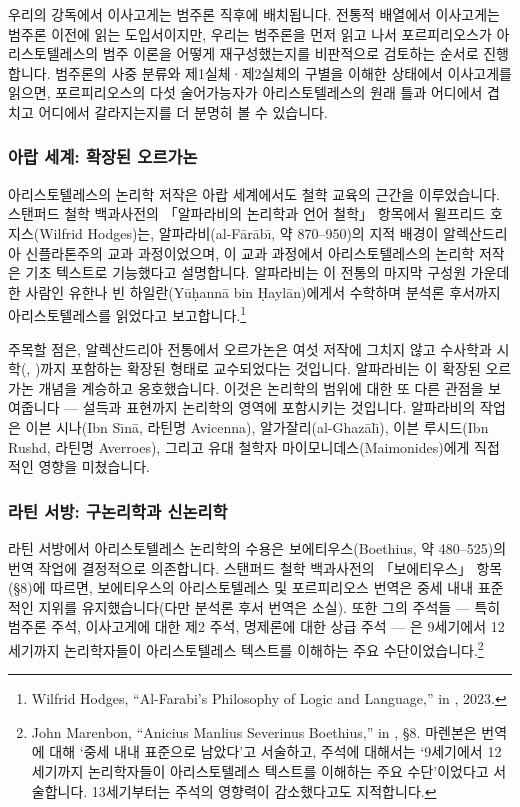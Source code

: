 \documentclass[12pt, a4paper]{article}
\begin{document}
우리의 강독에서 이사고게는 범주론 직후에 배치됩니다. 전통적 배열에서 이사고게는 범주론 이전에 읽는 도입서이지만, 우리는 범주론을 먼저 읽고 나서 포르피리오스가 아리스토텔레스의 범주 이론을 어떻게 재구성했는지를 비판적으로 검토하는 순서로 진행합니다. 범주론의 사중 분류와 제1실체·제2실체의 구별을 이해한 상태에서 이사고게를 읽으면, 포르피리오스의 다섯 술어가능자가 아리스토텔레스의 원래 틀과 어디에서 겹치고 어디에서 갈라지는지를 더 분명히 볼 수 있습니다.

\subsubsection{아랍 세계: 확장된 오르가논}

아리스토텔레스의 논리학 저작은 아랍 세계에서도 철학 교육의 근간을 이루었습니다. 스탠퍼드 철학 백과사전의 「알파라비의 논리학과 언어 철학」 항목에서 윌프리드 호지스(Wilfrid Hodges)는, 알파라비(al-F\=ar\=ab\=\i, 약 870--950)의 지적 배경이 알렉산드리아 신플라톤주의 교과 과정이었으며, 이 교과 과정에서 아리스토텔레스의 논리학 저작은 기초 텍스트로 기능했다고 설명합니다. 알파라비는 이 전통의 마지막 구성원 가운데 한 사람인 유한나 빈 하일란(Y\=u\d{h}ann\=a bin \d{H}ayl\=an)에게서 수학하며 분석론 후서까지 아리스토텔레스를 읽었다고 보고합니다.\footnote{Wilfrid Hodges, ``Al-Farabi's Philosophy of Logic and Language,'' in , 2023.}

주목할 점은, 알렉산드리아 전통에서 오르가논은 여섯 저작에 그치지 않고 수사학과 시학(, )까지 포함하는 확장된 형태로 교수되었다는 것입니다. 알파라비는 이 확장된 오르가논 개념을 계승하고 옹호했습니다. 이것은 논리학의 범위에 대한 또 다른 관점을 보여줍니다 --- 설득과 표현까지 논리학의 영역에 포함시키는 것입니다. 알파라비의 작업은 이븐 시나(Ibn S\=\i n\=a, 라틴명 Avicenna), 알가잘리(al-Ghaz\=al\=\i), 이븐 루시드(Ibn Rushd, 라틴명 Averroes), 그리고 유대 철학자 마이모니데스(Maimonides)에게 직접적인 영향을 미쳤습니다.

\subsubsection{라틴 서방: 구논리학과 신논리학}

라틴 서방에서 아리스토텔레스 논리학의 수용은 보에티우스(Boethius, 약 480--525)의 번역 작업에 결정적으로 의존합니다. 스탠퍼드 철학 백과사전의 「보에티우스」 항목(§8)에 따르면, 보에티우스의 아리스토텔레스 및 포르피리오스 번역은 중세 내내 표준적인 지위를 유지했습니다(다만 분석론 후서 번역은 소실). 또한 그의 주석들 --- 특히 범주론 주석, 이사고게에 대한 제2 주석, 명제론에 대한 상급 주석 --- 은 9세기에서 12세기까지 논리학자들이 아리스토텔레스 텍스트를 이해하는 주요 수단이었습니다.\footnote{John Marenbon, ``Anicius Manlius Severinus Boethius,'' in , §8. 마렌본은 번역에 대해 `중세 내내 표준으로 남았다'고 서술하고, 주석에 대해서는 `9세기에서 12세기까지 논리학자들이 아리스토텔레스 텍스트를 이해하는 주요 수단'이었다고 서술합니다. 13세기부터는 주석의 영향력이 감소했다고도 지적합니다.}
\end{document}
